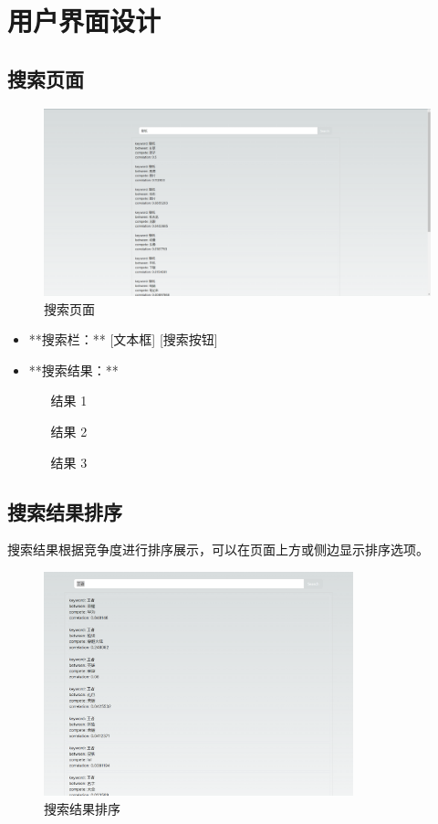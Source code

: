 \documentclass[11pt, a4paper, oneside]{ctexbook}
\begin{document}
\chapter{用户界面设计}

\section{搜索页面}

\begin{figure}[h]
  \centering
  \includegraphics[width=1\textwidth]{运行截图.png}
  \caption{搜索页面}
\end{figure}

\begin{itemize}
  \item **搜索栏：** [文本框] [搜索按钮]
  \item **搜索结果：**
  \begin{itemize}
    \item [结果 1]
    \item [结果 2]
    \item [结果 3]
  \end{itemize}
\end{itemize}

\section{搜索结果排序}

搜索结果根据竞争度进行排序展示，可以在页面上方或侧边显示排序选项。

\begin{figure}[h]
  \centering
  \includegraphics[width=0.8\textwidth]{运行截图2.jpg}
  \caption{搜索结果排序}
\end{figure}
\end{document}
